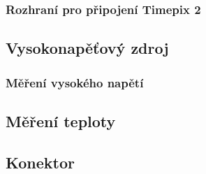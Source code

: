 	\subsubsection{Rozhraní pro připojení Timepix 2}	%
	
		
	\subsection{Vysokonapěťový zdroj}	%
		\subsubsection{Měření vysokého napětí} %
	\subsection{Měření teploty}	%
	\label{Mereni teploty}
	\subsection{Konektor}	%
	\label{konektor}
